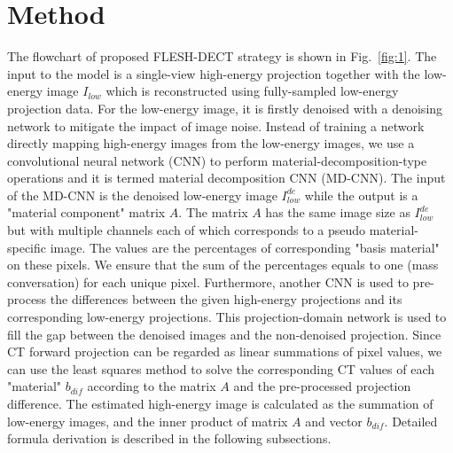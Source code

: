 \documentclass[journal,twoside,web]{ieeecolor}
\begin{document}
\section{Method}
\label{sect:method}
The flowchart of proposed FLESH-DECT strategy is shown in Fig.~\ref{fig:1}.
The input to the model is a single-view high-energy projection together with the low-energy image \(I_{low}\) which is reconstructed using fully-sampled low-energy projection data. For the low-energy image, it is firstly denoised with a denoising network to mitigate the impact of image noise. Instead of training a network directly mapping high-energy images from the low-energy images, we use a convolutional neural network (CNN) to perform material-decomposition-type operations and it is termed material decomposition CNN (MD-CNN). The input of the MD-CNN is the denoised low-energy image \(I_{low}^{de}\) while the output is a "material component" matrix \(A\). The matrix \(A\) has the same image size as \(I_{low}^{de}\) but with multiple channels each of which corresponds to a pseudo material-specific image. The values are the percentages of corresponding "basis material" on these pixels. We ensure that the sum of the percentages equals to one (mass conversation) for each unique pixel. Furthermore, another CNN is used to pre-process the differences between the given high-energy projections and its corresponding low-energy projections. This projection-domain network
is used to fill the gap between the denoised images and the non-denoised projection. Since CT forward projection can be regarded as linear summations of pixel values, we can use the least squares method to solve the corresponding CT values of each "material" \(b_{dif}\) according to the matrix \(A\) and the pre-processed projection difference. The estimated high-energy image is calculated as the summation of low-energy images, and the inner product of matrix \(A\) and vector \(b_{dif}\).
Detailed formula derivation is described in the following subsections.
\end{document}
